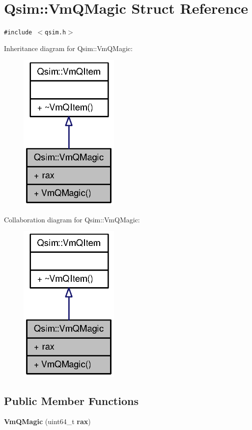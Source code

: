 \section{Qsim::VmQMagic Struct Reference}
\label{structQsim_1_1VmQMagic}
{\tt \#include $<$qsim.h$>$}

Inheritance diagram for Qsim::VmQMagic:\nopagebreak
\begin{figure}[H]
\begin{center}
\leavevmode
\includegraphics[width=138pt]{structQsim_1_1VmQMagic__inherit__graph}
\end{center}
\end{figure}
Collaboration diagram for Qsim::VmQMagic:\nopagebreak
\begin{figure}[H]
\begin{center}
\leavevmode
\includegraphics[width=138pt]{structQsim_1_1VmQMagic__coll__graph}
\end{center}
\end{figure}
\subsection*{Public Member Functions}
\begin{CompactItemize}
\item 
{\bf VmQMagic} (uint64\_\-t {\bf rax})
\end{CompactItemize}
